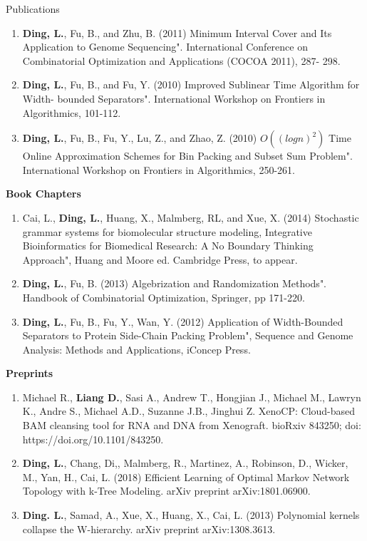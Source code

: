 \documentclass{resume} %
\begin{document}
\begin{rSection}{Publications}
\begin{enumerate}
\item \textbf{Ding, L.}, Fu, B., and Zhu, B. (2011) Minimum Interval Cover and Its Application to Genome Sequencing". International Conference on Combinatorial Optimization and Applications (COCOA 2011), 287- 298.

\item \textbf{Ding, L.}, Fu, B., and Fu, Y. (2010) Improved Sublinear Time Algorithm for Width- bounded Separators". International Workshop on Frontiers in Algorithmics, 101-112.

\item \textbf{Ding, L.}, Fu, B., Fu, Y., Lu, Z., and Zhao, Z. (2010) $O((log n)^2)$ Time Online Approximation Schemes for Bin Packing and Subset Sum Problem". International Workshop on Frontiers in Algorithmics, 250-261.
\end{enumerate}


\textbf{Book Chapters}
\begin{enumerate}
\item Cai, L., \textbf{Ding, L.}, Huang, X., Malmberg, RL, and Xue, X. (2014) Stochastic grammar systems for biomolecular structure modeling, Integrative Bioinformatics for Biomedical Research: A No Boundary Thinking Approach", Huang and Moore ed. Cambridge Press, to appear.

\item \textbf{Ding, L.}, Fu, B. (2013) Algebrization and Randomization Methods". Handbook of Combinatorial Optimization, Springer, pp 171-220.

\item \textbf{Ding, L.}, Fu, B., Fu, Y., Wan, Y. (2012) Application of Width-Bounded Separators to Protein Side-Chain Packing Problem", Sequence and Genome Analysis: Methods and Applications, iConcep Press.
\end{enumerate}


\textbf{Preprints}
\begin{enumerate}
\item Michael R., \textbf{Liang D.}, Sasi A., Andrew T., Hongjian J., Michael M., Lawryn K., Andre S., Michael A.D., Suzanne J.B., Jinghui Z. XenoCP: Cloud-based BAM cleansing tool for RNA and DNA from Xenograft. bioRxiv 843250; doi: https://doi.org/10.1101/843250.

\item \textbf{Ding, L.}, Chang, Di,, Malmberg, R., Martinez, A., Robinson, D., Wicker, M., Yan, H., Cai, L. (2018) Efficient Learning of Optimal Markov Network Topology with k-Tree Modeling. arXiv preprint arXiv:1801.06900.

\item \textbf{Ding. L.}, Samad, A., Xue, X., Huang, X., Cai, L. (2013) Polynomial kernels collapse the W-hierarchy. arXiv preprint arXiv:1308.3613.
\end{enumerate}
\end{rSection}
\end{document}
